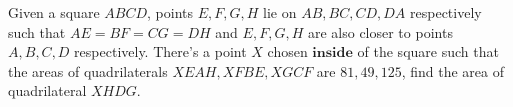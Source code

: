 Given a square $ABCD$, points $E,F,G,H$ lie on $AB,BC,CD,DA$ respectively such that $AE=BF=CG=DH$ and $E,F,G,H$ are also closer to points $A,B,C,D$ respectively. There's a point $X$ chosen $\textbf{inside}$ of the square such that the areas of quadrilaterals $XEAH, XFBE, XGCF$ are $81, 49, 125$, find the area of quadrilateral $XHDG$.
